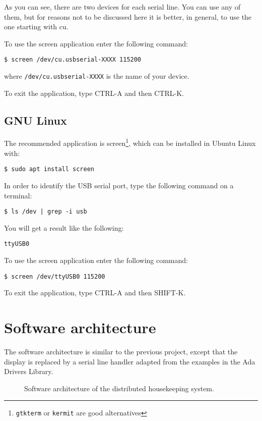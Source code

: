 As you can see, there are two devices for each serial line. You can use any of them, but for reasons not to be discussed here it is better, in general, to use the one starting with cu.

To use the screen application enter the following command:
\begin{verbatim}
$ screen /dev/cu.usbserial-XXXX 115200
\end{verbatim}

where {\tt /dev/cu.usbserial-XXXX} is the name of your device.

To exit the application, type CTRL-A and then CTRL-K.

\subsection{GNU Linux}

The recommended application is screen\footnote{{\tt gtkterm} or {\tt kermit} are good alternatives}, which can be installed in Ubuntu Linux with:
\begin{verbatim}
$ sudo apt install screen
\end{verbatim}

In order to identify the USB serial port, type the following command on a terminal:

\begin{verbatim}
$ ls /dev | grep -i usb
\end{verbatim}

You will get a result like the following:
\begin{verbatim}
ttyUSB0
\end{verbatim}

To use the screen application enter the following command:

\begin{verbatim}
$ screen /dev/ttyUSB0 115200
\end{verbatim}

To exit the application, type CTRL-A and then SHIFT-K.

\section{Software architecture}

The software architecture is similar to the previous project, except that the display is replaced by a serial line handler adapted from the examples in the Ada Drivers Library.


\begin{figure}[hbtp!]
            \caption{Software architecture of the distributed housekeeping system.}
            \label{fig:distributed}
\end{figure}

